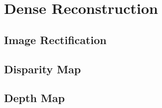 \section{Dense Reconstruction}

\subsection{Image Rectification}

\subsection{Disparity Map}

\subsection{Depth Map}
